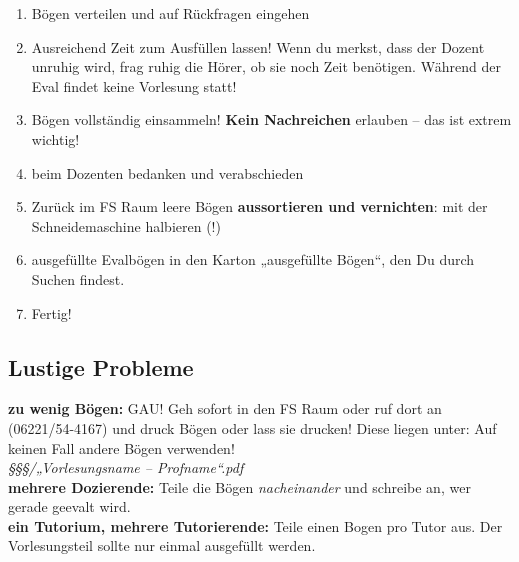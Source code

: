 \documentclass[a4paper,10pt]{article}
\begin{document}
\begin{enumerate}
\begin{itemize}
    \end{itemize}
\item Bögen verteilen und auf Rückfragen eingehen
\item Ausreichend Zeit zum Ausfüllen lassen! Wenn du merkst, dass der
  Dozent unruhig wird, frag ruhig die Hörer, ob sie noch Zeit
  benötigen. Während der Eval findet keine Vorlesung statt!
\item Bögen vollständig einsammeln! \textbf{Kein Nachreichen} erlauben -- das
  ist extrem wichtig!
\item beim Dozenten bedanken und verabschieden
\item Zurück im FS Raum leere Bögen \textbf{aussortieren und vernichten}: mit
  der Schneidemaschine halbieren (!)
\item ausgefüllte Evalbögen in den Karton „ausgefüllte Bögen“, den Du durch Suchen findest.
\item Fertig!
\end{enumerate}

\subsection*{Lustige Probleme}
\noindent\textbf{zu wenig Bögen:} GAU! Geh sofort in den FS Raum oder ruf dort an (06221/54-4167) und
druck Bögen oder lass sie drucken! Diese liegen unter: \hfill  Auf keinen Fall andere Bögen verwenden!\\
\textit{§§§/„Vorlesungsname -- Profname“.pdf}\\[0.2cm]
\noindent\textbf{mehrere Dozierende:} Teile die Bögen \emph{nacheinander} und schreibe an, wer gerade geevalt wird.\\[0.2cm]
\noindent\textbf{ein Tutorium, mehrere Tutorierende:} Teile einen Bogen pro Tutor aus. Der Vorlesungsteil sollte nur einmal ausgefüllt werden.
\end{document}
